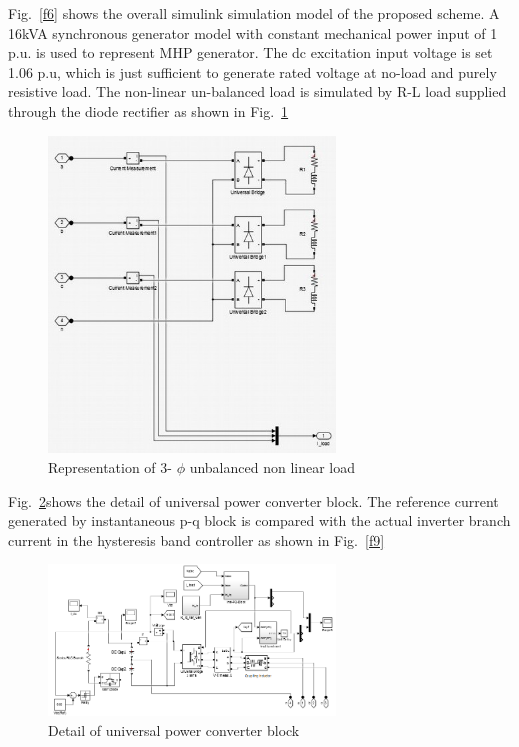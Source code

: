 \documentclass[journal,twoside]{IEEEtran}
\begin{document}
Fig.~\ref{f6} shows the overall simulink simulation model of the
proposed scheme. A 16kVA synchronous generator model with
constant mechanical power input of 1 p.u. is used to represent
MHP generator. The dc excitation input voltage is set 1.06 p.u,
which is just sufficient to generate rated voltage at no-load and
purely resistive load. The non-linear un-balanced load is
simulated by R-L load supplied through the diode rectifier as
shown in Fig.~\ref{f7}

\begin{figure}[!ht]
\centering
\includegraphics[width=3in]{7}
\caption{Representation of 3- $\phi$ unbalanced non linear load}
\label{f7}
\end{figure}
Fig.~\ref{f8}shows the detail of universal power converter block. The
reference current generated by instantaneous p-q block is
compared with the actual inverter branch current in the
hysteresis band controller as shown in Fig.~\ref{f9}

\begin{figure}[!ht]
\centering
\includegraphics[width=3in]{8}
\caption{Detail of universal power converter block}
\label{f8}
\end{figure}
\end{document}
